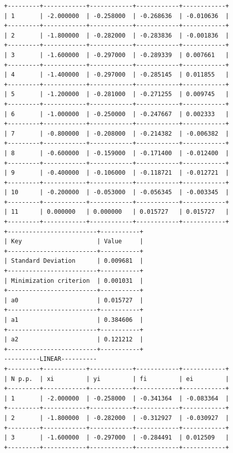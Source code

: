 \documentclass[12pt,one column]{article}
\begin{document}
\begin{verbatim}
+---------+------------+------------+------------+------------+
| 1       | -2.000000  | -0.258000  | -0.268636  | -0.010636  | 
+---------+------------+------------+------------+------------+
| 2       | -1.800000  | -0.282000  | -0.283836  | -0.001836  | 
+---------+------------+------------+------------+------------+
| 3       | -1.600000  | -0.297000  | -0.289339  | 0.007661   | 
+---------+------------+------------+------------+------------+
| 4       | -1.400000  | -0.297000  | -0.285145  | 0.011855   | 
+---------+------------+------------+------------+------------+
| 5       | -1.200000  | -0.281000  | -0.271255  | 0.009745   | 
+---------+------------+------------+------------+------------+
| 6       | -1.000000  | -0.250000  | -0.247667  | 0.002333   | 
+---------+------------+------------+------------+------------+
| 7       | -0.800000  | -0.208000  | -0.214382  | -0.006382  | 
+---------+------------+------------+------------+------------+
| 8       | -0.600000  | -0.159000  | -0.171400  | -0.012400  | 
+---------+------------+------------+------------+------------+
| 9       | -0.400000  | -0.106000  | -0.118721  | -0.012721  | 
+---------+------------+------------+------------+------------+
| 10      | -0.200000  | -0.053000  | -0.056345  | -0.003345  | 
+---------+------------+------------+------------+------------+
| 11      | 0.000000   | 0.000000   | 0.015727   | 0.015727   | 
+---------+------------+------------+------------+------------+
+-------------------------+-----------+
| Key                     | Value     | 
+-------------------------+-----------+
| Standard Deviation      | 0.009681  | 
+-------------------------+-----------+
| Minimization criterion  | 0.001031  | 
+-------------------------+-----------+
| a0                      | 0.015727  | 
+-------------------------+-----------+
| a1                      | 0.384606  | 
+-------------------------+-----------+
| a2                      | 0.121212  | 
+-------------------------+-----------+
----------LINEAR----------
+---------+------------+------------+------------+------------+
| N p.p.  | xi         | yi         | fi         | ei         | 
+---------+------------+------------+------------+------------+
| 1       | -2.000000  | -0.258000  | -0.341364  | -0.083364  | 
+---------+------------+------------+------------+------------+
| 2       | -1.800000  | -0.282000  | -0.312927  | -0.030927  | 
+---------+------------+------------+------------+------------+
| 3       | -1.600000  | -0.297000  | -0.284491  | 0.012509   | 
+---------+------------+------------+------------+------------+

\end{verbatim}
\end{document}
